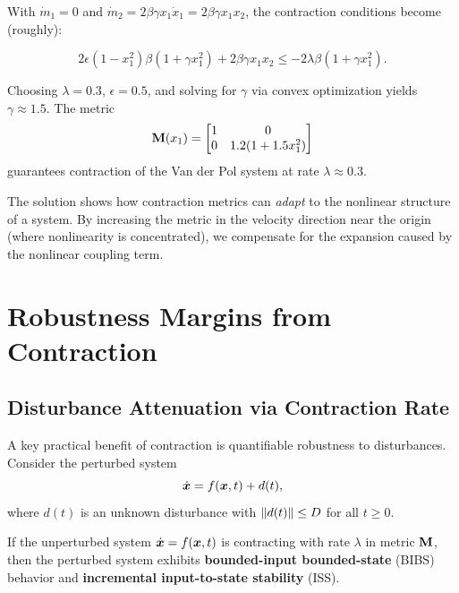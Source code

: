 With $\dot{m}_1 = 0$ and $\dot{m}_2 = 2\beta\gamma x_1 \dot{x}_1 = 2\beta\gamma x_1 x_2$,
the contraction conditions become (roughly):

\begin{equation}
2\epsilon(1-x_1^2)\beta(1+\gamma x_1^2) + 2\beta\gamma x_1 x_2 \leq -2\lambda\beta(1+\gamma x_1^2).
\end{equation}

Choosing $\lambda = 0.3$, $\epsilon = 0.5$, and solving for $\gamma$ via convex optimization
yields $\gamma \approx 1.5$. The metric
\begin{equation}
\mathbf{M}(x_1) = \begin{bmatrix} 1 & 0 \\ 0 & 1.2(1+1.5x_1^2) \end{bmatrix}
\label{eq:ch4:vdp-metric-solution}
\end{equation}
guarantees contraction of the Van der Pol system at rate $\lambda \approx 0.3$.

\begin{intuitionbox}
The solution shows how contraction metrics can \emph{adapt} to the nonlinear structure
of a system. By increasing the metric in the velocity direction near the origin
(where nonlinearity is concentrated), we compensate for the expansion caused by the
nonlinear coupling term.
\end{intuitionbox}


\section{Robustness Margins from Contraction}

\subsection{Disturbance Attenuation via Contraction Rate}

A key practical benefit of contraction is quantifiable robustness to disturbances.
Consider the perturbed system
\begin{equation}
\dot{\bm{x}} = f(\bm{x},t) + d(t),
\label{eq:ch4:perturbed-system}
\end{equation}
where $d(t)$ is an unknown disturbance with $\left\lVert d(t) \right\rVert \leq D$ for all $t \geq 0$.

If the unperturbed system $\dot{\bm{x}} = f(\bm{x},t)$ is contracting with rate $\lambda$ in
metric $\mathbf{M}$, then the perturbed system exhibits \textbf{bounded-input bounded-state}
(BIBS) behavior and \textbf{incremental input-to-state stability} (ISS).

